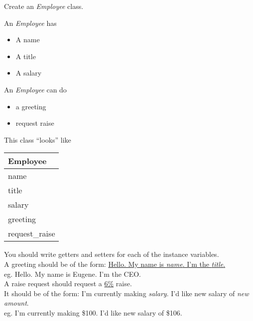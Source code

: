 




	\item Create an \textit{Employee} class.\\
	\begin{minipage}{.6\textwidth}		
		An \textit{Employee} has
		\begin{itemize}
			\item A name
			\item A title
			\item A salary	
		\end{itemize}
	
		An \textit{Employee} can do
		\begin{itemize}
			\item a greeting
			\item request raise
		\end{itemize}
	\end{minipage} 
	\begin{minipage}{.4\textwidth}
		This class ``looks'' like 
				
		\vspace*{1em}
		\begin{tabular}{|l|}
			\hline Employee\\ \hline
			name\\ title\\ salary\\ \hline
			greeting\\ request\_raise \\  \hline
		\end{tabular}
	\end{minipage}

	\vspace*{2ex}
	You should write getters and setters for each of the instance variables.\\

	A greeting should be of the form: \underline{Hello.  My name is \textit{name}.  
	I'm the \textit{title}.}\\
	\tab \tab eg. Hello.  My name is Eugene.  I'm the CEO.\\

	A raise request should request a \underline{6\%} raise.\\  It should be of the form: 
	I'm currently making \textit{salary}.  I'd like new salary of \textit{new amount}.\\
	\tab \tab eg. I'm currently making \$100.  I'd like new salary of \$106.\\



